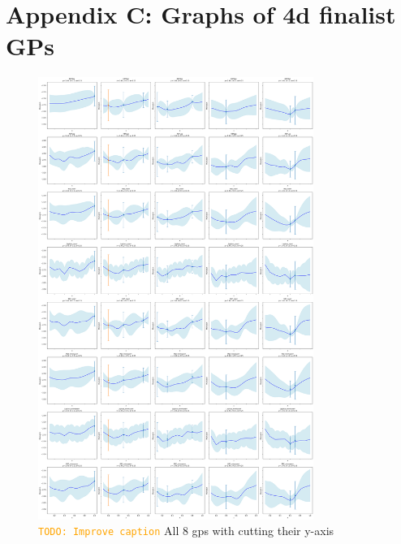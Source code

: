 \documentclass[12pt]{article}
\newcommand{\todo}[1]{\textcolor{orange}{\texttt{TODO: #1}}}
\begin{document}
\section{Appendix C: Graphs of 4d finalist GPs}
\label{appendix:C}


\begin{figure}[H]
    \centering
    \includegraphics[width=0.8\textwidth]{LatexPlots/final_gps_plots/final_gps_ycuts.png}
    \caption{\todo{Improve caption} All 8 gps with cutting their y-axis}
    \label{fig:best8_ycuts}
\end{figure}
\end{document}
